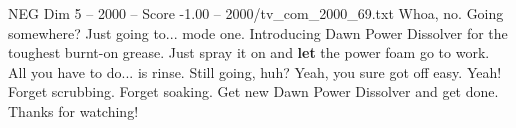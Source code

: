 \begin{textsample}{NEG Dim 5 – 2000 – Score -1.00 – 2000/tv\_com\_2000\_69.txt}  \label{ex:f5_neg_038}
Whoa, no.
Going somewhere?
Just going to... mode one.
Introducing Dawn Power Dissolver for the toughest burnt-on grease.
Just spray it on and \textbf{let} the power foam go to work.
All you have to do... is rinse.
Still going, huh?
Yeah, you sure got off easy.
Yeah!
Forget scrubbing.
Forget soaking.
Get new Dawn Power Dissolver and get done.
Thanks for watching!

\end{textsample}
